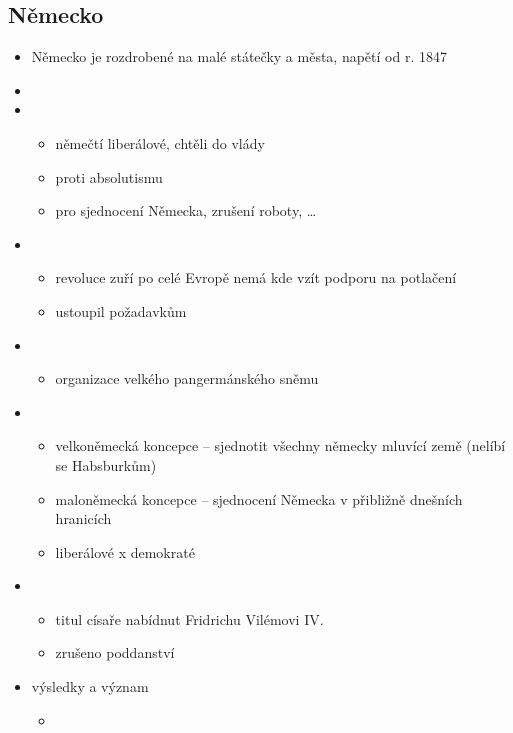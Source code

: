 \subsection{Německo}
\begin{itemize}
\item Německo je rozdrobené na malé státečky a města, napětí od r. 1847
\item {}
\item {}
	\begin{itemize}
	\item němečtí liberálové, chtěli do vlády
	\item proti absolutismu
	\item pro sjednocení Německa, zrušení roboty, \ldots
	\end{itemize}
\item {}
	\begin{itemize}
	\item revoluce zuří po celé Evropě \ra nemá kde vzít podporu na potlačení
	\item ustoupil požadavkům
	\end{itemize}
\item {}
	\begin{itemize}
	\item organizace velkého pangermánského sněmu
	\end{itemize}
\item {}
	\begin{itemize}
	\item velkoněmecká koncepce -- sjednotit všechny německy mluvící země (nelíbí se Habsburkům)
	\item maloněmecká koncepce -- sjednocení Německa v přibližně dnešních hranicích
	\item liberálové x demokraté
	\end{itemize}
\item {}
	\begin{itemize}
	\item titul císaře nabídnut Fridrichu Vilémovi IV.
	\item zrušeno poddanství
	\end{itemize}
\item výsledky a význam
	\begin{itemize}
	\item {}

\end{itemize}
\end{itemize}
